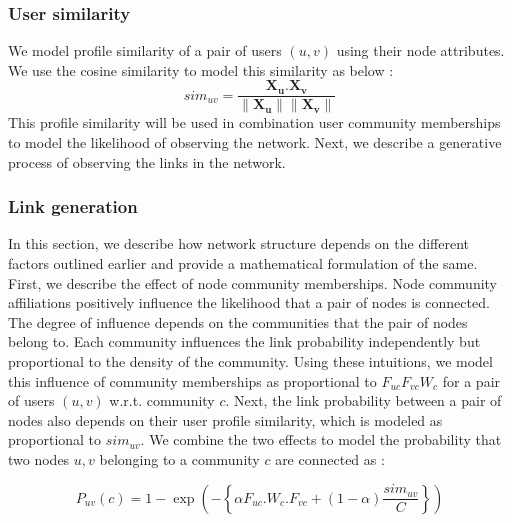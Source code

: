 \documentclass[11pt]{article}
\begin{document}
\subsubsection*{User similarity}
We model profile similarity of a pair of users $(u,v)$ using their node attributes. We use the cosine similarity to model this similarity as below : 
\[ sim_{uv} = \frac{\mathbf{X_u} \textbf{.} \mathbf{X_v} }{\| \mathbf{X_u}\| \|  \mathbf{X_v} \|}\]
This profile similarity will be used in combination user community memberships to model the likelihood of observing the network. Next, we describe a generative process of observing the links in the network.
\subsubsection*{Link generation}
In this section, we  describe how network structure depends on the different factors  outlined earlier and provide a mathematical formulation of the same.  First, we describe the effect of node community memberships.
Node community affiliations positively influence the likelihood that a pair of nodes is connected. The degree of influence depends on the communities that the pair of nodes belong to. Each community influences the link probability independently but proportional to the density of the community. Using these intuitions, we model this influence of community memberships as proportional to $F_{uc} F_{vc} W_c$ for a pair of users $(u,v)$ w.r.t. community $c$.
Next, the link probability between a pair of nodes also depends on their user profile similarity, which is modeled as proportional to $sim_{uv}$.  We combine the two effects to model the probability that two nodes $u, v$ belonging to a community $c$ are connected as : 

\[ P_{uv} (c) = 1 - \exp(- \left\lbrace \alpha F_{uc}. W_c. F_{vc} + (1 - \alpha) \frac{sim_{uv}}{C} \right\rbrace ) \]
\end{document}
